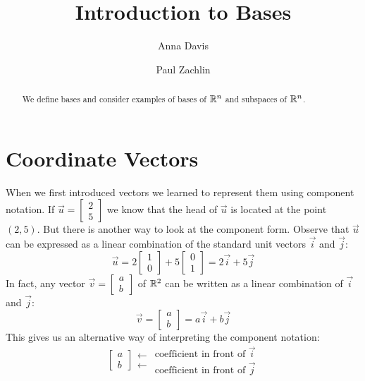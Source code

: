 \documentclass{ximera}
\author{Anna Davis \and Paul Zachlin} \title{Introduction to Bases} \license{CC-BY 4.0}
\begin{document}
\begin{abstract}
We define bases and consider examples of bases of $\mathbb{R}^n$ and subspaces of $\mathbb{R}^n$.
\end{abstract}
\maketitle

\section*{Coordinate Vectors}
When we first introduced vectors we learned to represent them using component notation.  If $\vec{u}=\begin{bmatrix}2\\5\end{bmatrix}$ we know that the head of $\vec{u}$ is located at the point $(2, 5)$.  But there is another way to look at the component form.  Observe that $\vec{u}$ can be expressed as a linear combination of the standard unit vectors $\vec{i}$ and $\vec{j}$:
$$\vec{u}=2\begin{bmatrix}1\\0\end{bmatrix}+5\begin{bmatrix}0\\1\end{bmatrix}=2\vec{i}+5\vec{j}$$
In fact, any vector $\vec{v}=\begin{bmatrix}a\\b\end{bmatrix}$ of $\RR^2$ can be written as a linear combination of $\vec{i}$ and $\vec{j}$:
$$\vec{v}=\begin{bmatrix}a\\b\end{bmatrix}=a\vec{i}+b\vec{j}$$
This gives us an alternative way of interpreting the component notation:
$$\left[\begin{array}{c}  
 a\\b
 \end{array}\right]
 \begin{array}{c}
 
 \longleftarrow\\
 \longleftarrow

 \end{array}
\begin{array}{c}  
 \mbox{coefficient in front of $\vec{i}$}\\\mbox{coefficient in front of $\vec{j}$}
 \end{array}$$
 
\end{document}

